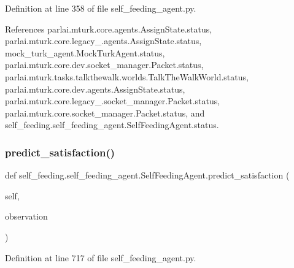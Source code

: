 Definition at line 358 of file self\+\_\+feeding\+\_\+agent.\+py.



References parlai.\+mturk.\+core.\+agents.\+Assign\+State.\+status, parlai.\+mturk.\+core.\+legacy\+\_.\+agents.\+Assign\+State.\+status, mock\+\_\+turk\+\_\+agent.\+Mock\+Turk\+Agent.\+status, parlai.\+mturk.\+core.\+dev.\+socket\+\_\+manager.\+Packet.\+status, parlai.\+mturk.\+tasks.\+talkthewalk.\+worlds.\+Talk\+The\+Walk\+World.\+status, parlai.\+mturk.\+core.\+dev.\+agents.\+Assign\+State.\+status, parlai.\+mturk.\+core.\+legacy\+\_.\+socket\+\_\+manager.\+Packet.\+status, parlai.\+mturk.\+core.\+socket\+\_\+manager.\+Packet.\+status, and self\+\_\+feeding.\+self\+\_\+feeding\+\_\+agent.\+Self\+Feeding\+Agent.\+status.

\mbox{\label{classself__feeding_1_1self__feeding__agent_1_1SelfFeedingAgent_ab995d9cb7e699570a4179865ce7e09be}} 
\subsubsection{\texorpdfstring{predict\+\_\+satisfaction()}{predict\_satisfaction()}}
{\footnotesize\ttfamily def self\+\_\+feeding.\+self\+\_\+feeding\+\_\+agent.\+Self\+Feeding\+Agent.\+predict\+\_\+satisfaction (\begin{DoxyParamCaption}\item[{}]{self,  }\item[{}]{observation }\end{DoxyParamCaption})}



Definition at line 717 of file self\+\_\+feeding\+\_\+agent.\+py.



